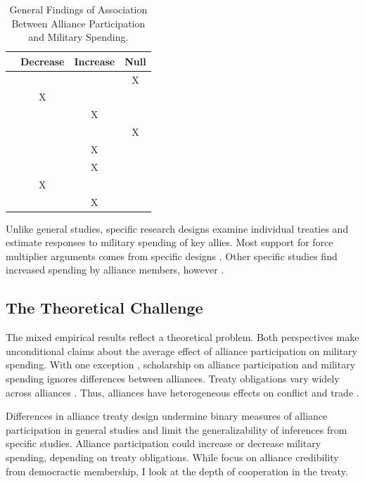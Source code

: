 \documentclass[12pt]{article}
\begin{document}
\begin{table}[hbt!]
\begin{center}
\begin{tabular}{lccc}
     & Decrease & Increase & Null \\
\hline
\citet{MostSiverson1987} &  &  & X \\
\citet{Conybeare1994} & X & &  \\
\citet{Diehl1994} &  & X &  \\
\citet{Goldsmith2003} &  &  & X \\
\citet{MorganPalmer2006} &  & X & \\ 
\citet{QuirozFlores2011} &  & X &  \\ 
\citet{DigiuseppePoast2016} & X &  & \\ 
\citet{Horowitzetal2017} &  & X & \\ 
\hline
\end{tabular}
\caption{General Findings of Association Between Alliance Participation and Military Spending.}
\label{tab:results-sum}
\end{center} 
\end{table}


Unlike general studies, specific research designs examine individual treaties and estimate responses to military spending of key allies. 
Most support for force multiplier arguments comes from specific designs \citep{BarnettLevy1991, Morrow1993, Sorokin1994, PluemperNeumayer2015}.
Other specific studies find increased spending by alliance members, however \citep{ConybeareSandler1990, Chenetal1996}. 


\subsection{The Theoretical Challenge}


The mixed empirical results reflect a theoretical problem. 
Both perspectives make unconditional claims about the average effect of alliance participation on military spending.  
With one exception \citep{DigiuseppePoast2016}, scholarship on alliance participation and military spending ignores differences between alliances.
Treaty obligations vary widely across alliances \citep{Leedsetal2002}.
Thus, alliances have heterogeneous effects on conflict \citep{Leeds2003, Benson2012} and trade \citep{Long2003, LongLeeds2006}. 


Differences in alliance treaty design undermine binary measures of alliance participation in general studies and limit the generalizability of inferences from specific studies. 
Alliance participation could increase or decrease military spending, depending on treaty obligations. 
While \citet{DigiuseppePoast2016} focus on alliance credibility from democractic membership, I look at the depth of cooperation in the treaty. 
\end{document}
